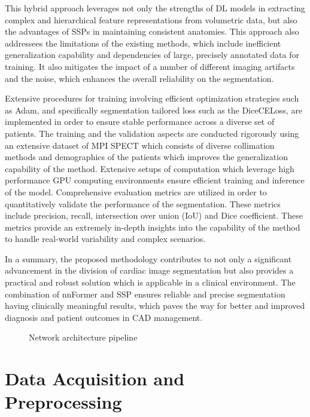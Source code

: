 This hybrid approach leverages not only the strengths of DL models in extracting complex and hierarchical feature representations from volumetric data, but also the advantages of SSPs in maintaining consistent anatomies. This approach also addressees the limitations of the existing methods, which include inefficient generalization capability and dependencies of large, precisely annotated data for training. It also mitigates the impact of a number of different imaging artifacts and the noise, which enhances the overall reliability on the segmentation.

Extensive procedures for training involving efficient optimization strategies such as Adam, and specifically segmentation tailored loss such as the DiceCELoss, are implemented in order to ensure stable performance across a diverse set of patients. The training and the validation aspects are conducted rigorously using an extensive dataset of MPI SPECT which consists of diverse collimation methods and demographics of the patients which improves the generalization capability of the method. Extensive setups of computation which leverage high performance GPU computing environments ensure efficient training and inference of the model. Comprehensive evaluation metrics are utilized in order to quantitatively validate the performance of the segmentation. These metrics include precision, recall, intersection over union (IoU) and Dice coefficient. These metrics provide an extremely in-depth insights into the capability of the method to handle real-world variability and complex scenarios.

In a summary, the proposed methodology contributes to not only a significant advancement in the division of cardiac image segmentation but also provides a practical and robust solution which is applicable in a clinical environment. The combination of nnFormer and SSP ensures reliable and precise segmentation having clinically meaningful results, which paves the way for better and improved diagnosis and patient outcomes in CAD management.

\begin{figure}[htb!] %
\centering
\centering
\resizebox{1\textwidth}{!}{

}
\caption{\centering Network architecture pipeline}
\label{Fig:network_pipeline}
\end{figure}

\section{Data Acquisition and Preprocessing}

